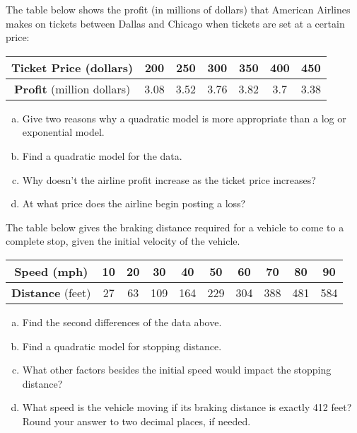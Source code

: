 \documentclass[notes]{subfiles}
\begin{document}
		\begin{ex}
			The table below shows the profit (in millions of dollars) that American Airlines makes on tickets between Dallas and Chicago when tickets are set at a certain price:
				\begin{center}
					{\renewcommand{\arraystretch}{1.2}
					\begin{tabular}{|c||c|c|c|c|c|c|}\hline
						\textbf{Ticket Price} (dollars) & 200 & 250 & 300 & 350 & 400 & 450 \\ \hline
						\textbf{Profit} (million dollars) & 3.08 & 3.52 & 3.76 & 3.82 & 3.7 & 3.38\\ \hline
					\end{tabular}
					}
				\end{center}
				\begin{enumerate}[(a)]
					\item Give two reasons why a quadratic model is more appropriate than a log or exponential model.
					\item Find a quadratic model for the data.
						\newpage

					\item Why doesn't the airline profit increase as the ticket price increases?
					\item At what price does the airline begin posting a loss?
				\end{enumerate}
		\end{ex}
		
		\begin{ex}
			The table below gives the braking distance required for a vehicle to come to a complete stop, given the initial velocity of the vehicle.
				\begin{center}
					{\renewcommand{\arraystretch}{1.2}
					\begin{tabular}{|c||c|c|c|c|c|c|c|c|c|}\hline
						\textbf{Speed} (mph) & 10 & 20 & 30 & 40 & 50 & 60 & 70 & 80 & 90 \\ \hline
						\textbf{Distance} (feet) & 27 & 63 & 109 & 164 & 229 & 304 & 388 & 481 & 584\\ \hline
					\end{tabular}
					}
				\end{center}
				\begin{enumerate}[(a)]
					\item Find the second differences of the data above.
						\vs{1.5}
					\item Find a quadratic model for stopping distance.
						\vs{1}
					\item What other factors besides the initial speed would impact the stopping distance?
						\vs{.5}
					\item What speed is the vehicle moving if its braking distance is exactly 412 feet?  Round your answer to two decimal places, if needed.
						\vs{.5}
				\end{enumerate}
		\end{ex}
			\newpage
\end{document}
